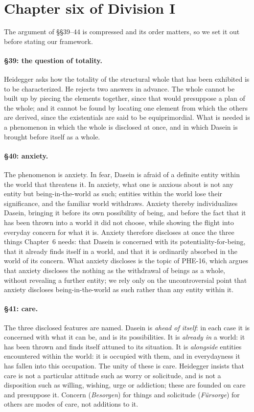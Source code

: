 \documentclass{situationist-preprint}
\begin{document}
\section{Chapter six of Division I}\label{s:ch6}

The argument of \S\S39--44 is compressed and its order matters, so we set it out before stating our framework.

\paragraph{\S39: the question of totality.} Heidegger asks how the totality of the structural whole that has been exhibited is to be characterized. He rejects two answers in advance. The whole cannot be built up by piecing the elements together, since that would presuppose a plan of the whole; and it cannot be found by locating one element from which the others are derived, since the existentials are said to be equiprimordial. What is needed is a phenomenon in which the whole is disclosed at once, and in which Dasein is brought before itself as a whole.

\paragraph{\S40: anxiety.} The phenomenon is anxiety. In fear, Dasein is afraid of a definite entity within the world that threatens it. In anxiety, what one is anxious about is not any entity but being-in-the-world as such; entities within the world lose their significance, and the familiar world withdraws. Anxiety thereby individualizes Dasein, bringing it before its own possibility of being, and before the fact that it has been thrown into a world it did not choose, while showing the flight into everyday concern for what it is. Anxiety therefore discloses at once the three things Chapter~6 needs: that Dasein is concerned with its potentiality-for-being, that it already finds itself in a world, and that it is ordinarily absorbed in the world of its concern. What anxiety discloses is the topic of PHE-16, which argues that anxiety discloses the nothing as the withdrawal of beings as a whole, without revealing a further entity; we rely only on the uncontroversial point that anxiety discloses being-in-the-world as such rather than any entity within it.

\paragraph{\S41: care.} The three disclosed features are named. Dasein is \emph{ahead of itself}: in each case it is concerned with what it can be, and is its possibilities. It is \emph{already in} a world: it has been thrown and finds itself attuned to its situation. It is \emph{alongside} entities encountered within the world: it is occupied with them, and in everydayness it has fallen into this occupation. The unity of these is care. Heidegger insists that care is not a particular attitude such as worry or solicitude, and is not a disposition such as willing, wishing, urge or addiction; these are founded on care and presuppose it. Concern (\emph{Besorgen}) for things and solicitude (\emph{F\"ursorge}) for others are modes of care, not additions to it.
\end{document}

